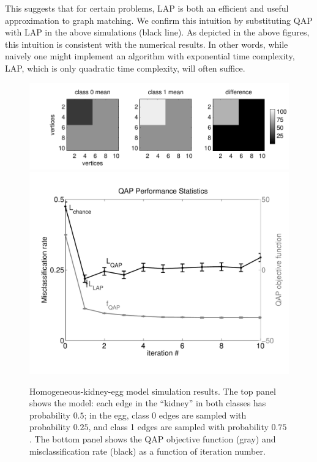 \documentclass{article} %
\begin{document}
This suggests that for certain problems, LAP is both an efficient and useful approximation to graph matching.  We confirm this intuition by substituting QAP with LAP in the above simulations (black line).  As depicted in the above figures, this intuition is consistent with the numerical results. In other words, while naively one might implement an algorithm with exponential time complexity, LAP, which is only quadratic time complexity, will often suffice.




\begin{figure}[htbp]
	\centering			
	\includegraphics[width=1\linewidth]{../figs/homo_kidney_egg_model}
	\includegraphics[width=1\linewidth]{../figs/homo_kidney_egg_performance}
	\caption{Homogeneous-kidney-egg model simulation results. The top panel shows the model: each edge in the ``kidney'' in both classes has probability $0.5$; in the egg, class 0 edges are sampled with probability $0.25$, and class 1 edges are sampled with probability $0.75$. The bottom panel shows the QAP objective function (gray) and misclassification rate (black) as a function of iteration number.  }
	\label{fig:fwpath}
\end{figure}
\end{document}
